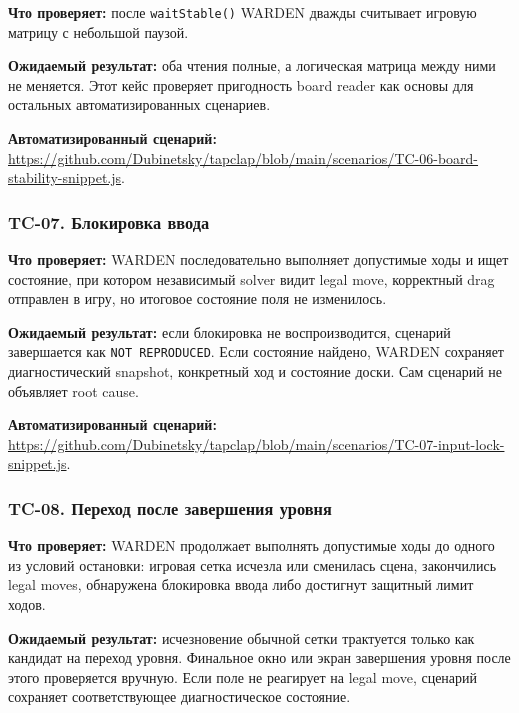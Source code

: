 \documentclass{ZGJournalArticle_2026}
\begin{document}
\textbf{Что проверяет:} после \texttt{waitStable()} WARDEN дважды
считывает игровую матрицу с небольшой паузой.

\textbf{Ожидаемый результат:} оба чтения полные, а логическая матрица
между ними не меняется. Этот кейс проверяет пригодность board reader как
основы для остальных автоматизированных сценариев.

\textbf{Автоматизированный сценарий:}
\href{../scenarios/TC-06-board-stability-snippet.js}{https://github.com/Dubinetsky/tapclap/blob/main/scenarios/TC-06-board-stability-snippet.js}.

\subsubsection{TC-07. Блокировка
ввода}\label{tc-07.-ux431ux43bux43eux43aux438ux440ux43eux432ux43aux430-ux432ux432ux43eux434ux430}

\textbf{Что проверяет:} WARDEN последовательно выполняет допустимые ходы
и ищет состояние, при котором независимый solver видит legal move,
корректный drag отправлен в игру, но итоговое состояние поля не
изменилось.

\textbf{Ожидаемый результат:} если блокировка не воспроизводится,
сценарий завершается как \texttt{NOT\ REPRODUCED}. Если состояние
найдено, WARDEN сохраняет диагностический snapshot, конкретный ход и
состояние доски. Сам сценарий не объявляет root cause.

\textbf{Автоматизированный сценарий:}
\href{../scenarios/TC-07-input-lock-snippet.js}{https://github.com/Dubinetsky/tapclap/blob/main/scenarios/TC-07-input-lock-snippet.js}.

\subsubsection{TC-08. Переход после завершения
уровня}\label{tc-08.-ux43fux435ux440ux435ux445ux43eux434-ux43fux43eux441ux43bux435-ux437ux430ux432ux435ux440ux448ux435ux43dux438ux44f-ux443ux440ux43eux432ux43dux44f}

\textbf{Что проверяет:} WARDEN продолжает выполнять допустимые ходы до
одного из условий остановки: игровая сетка исчезла или сменилась сцена,
закончились legal moves, обнаружена блокировка ввода либо достигнут
защитный лимит ходов.

\textbf{Ожидаемый результат:} исчезновение обычной сетки трактуется
только как кандидат на переход уровня. Финальное окно или экран
завершения уровня после этого проверяется вручную. Если поле не
реагирует на legal move, сценарий сохраняет соответствующее
диагностическое состояние.
\end{document}
